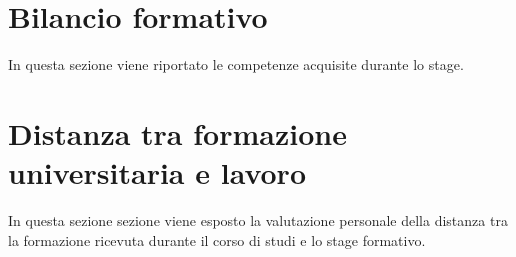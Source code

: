\section{Bilancio formativo}
In questa sezione viene riportato le competenze acquisite durante lo stage.




\section{Distanza tra formazione universitaria e lavoro}
In questa sezione sezione viene esposto la valutazione personale della distanza tra la formazione ricevuta durante il corso di studi e lo stage formativo.
